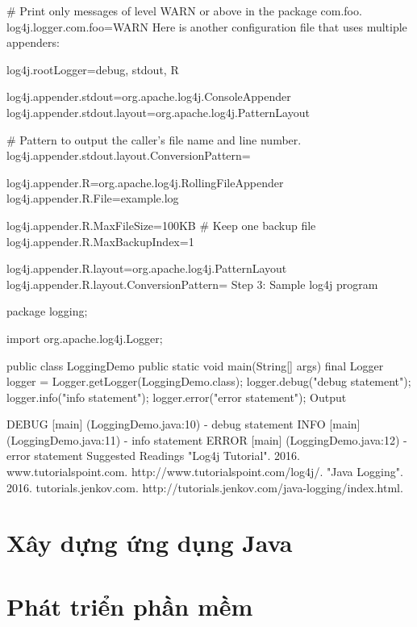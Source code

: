 # Print only messages of level WARN or above in the package com.foo.
log4j.logger.com.foo=WARN
Here is another configuration file that uses multiple appenders:

log4j.rootLogger=debug, stdout, R

log4j.appender.stdout=org.apache.log4j.ConsoleAppender
log4j.appender.stdout.layout=org.apache.log4j.PatternLayout

# Pattern to output the caller's file name and line number.
log4j.appender.stdout.layout.ConversionPattern=%

log4j.appender.R=org.apache.log4j.RollingFileAppender
log4j.appender.R.File=example.log

log4j.appender.R.MaxFileSize=100KB
# Keep one backup file
log4j.appender.R.MaxBackupIndex=1

log4j.appender.R.layout=org.apache.log4j.PatternLayout
log4j.appender.R.layout.ConversionPattern=%
Step 3: Sample log4j program

package logging;

import org.apache.log4j.Logger;

public class LoggingDemo {
    public static void main(String[] args) {
        final Logger logger = Logger.getLogger(LoggingDemo.class);
        logger.debug("debug statement");
        logger.info("info statement");
        logger.error("error statement");
    }
}
Output

DEBUG [main] (LoggingDemo.java:10) - debug statement
 INFO [main] (LoggingDemo.java:11) - info statement
ERROR [main] (LoggingDemo.java:12) - error statement
Suggested Readings
"Log4j Tutorial". 2016. www.tutorialspoint.com. http://www.tutorialspoint.com/log4j/.
"Java Logging". 2016. tutorials.jenkov.com. http://tutorials.jenkov.com/java-logging/index.html.

\part{Xây dựng ứng dụng Java}

\part{Phát triển phần mềm}

























